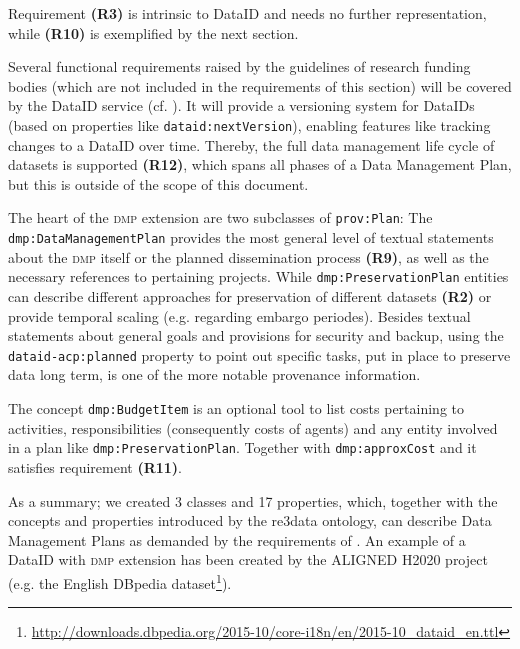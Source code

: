 \documentclass[runningheads,a4paper]{llncs}
\newcommand{\dmp}{{\scshape dmp}\xspace}
\newcommand{\prop}[1]{{{\texttt{#1}}}}
\newcommand\footnoteurl[1]{\footnote{\scriptsize\url{#1}}}
\begin{document}
Requirement \textbf{(R3)} is intrinsic to DataID and needs no further representation, while \textbf{(R10)} is exemplified by the next section.

Several functional requirements raised by the guidelines of research funding bodies (which are not included in the requirements of this section) will be covered by the DataID service (cf. ). It will provide a versioning system for DataIDs (based on properties like \prop{dataid:nextVersion}), enabling features like tracking changes to a DataID over time.
Thereby, the full data management life cycle of datasets is supported \textbf{(R12)}, which spans all phases of a Data Management Plan, but this is outside of the scope of this document.

The heart of the \dmp extension are two subclasses of \prop{prov:Plan}:
The \prop{dmp:DataManagementPlan} provides the most general level of textual statements about the \dmp itself or the planned dissemination process \textbf{(R9)}, as well as the necessary references to pertaining projects. While \prop{dmp:PreservationPlan} entities can describe different approaches for preservation of different datasets \textbf{(R2)} or provide temporal scaling (e.g. regarding embargo periodes). Besides textual statements about general goals and provisions for security and backup, using the \prop{dataid-acp:planned} property to point out specific tasks, put in place to preserve data long term, is one of the more notable provenance information.

The concept \prop{dmp:BudgetItem} is an optional tool to list costs pertaining to activities, responsibilities (consequently costs of agents) and any entity involved in a plan like \prop{dmp:PreservationPlan}. Together with \prop{dmp:approxCost} and\hfill \break \prop{dmp:justification} it satisfies requirement \textbf{(R11)}.

As a summary; we created 3 classes and 17 properties, which, together with the concepts and properties introduced by the re3data ontology, can describe Data Management Plans as demanded by the requirements of .
An example of a DataID with \dmp extension has been created by the ALIGNED H2020 project (e.g. the English DBpedia dataset\footnoteurl{http://downloads.dbpedia.org/2015-10/core-i18n/en/2015-10_dataid_en.ttl}).
\end{document}
